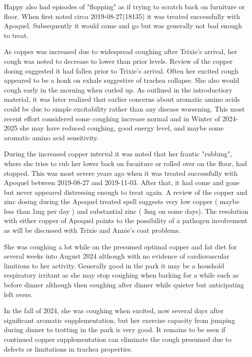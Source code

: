 {Happy also had episodes of "flopping"  as if trying to scratch
back on furniture or floor. When first noted circa 2019-08-27(18135)
it was treated successfully with Apoquel. Subsequently it would
come and go but was generally not bad enough to treat.
 

As copper was increased due to widespread coughing after Trixie's
arrival, her cough was noted to decrease to lower than prior levels.
Review of the copper dosing suggested it had fallen prior to Trixie's
arrival.
Often her excited cough appeared to be a honk on exhale suggestive of
trachea collapse. She also would cough early in the morning
when curled up. 
As outlined in the introductiory material, it was later realized 
that earlier concerns about aromatic amino acids could be
due to simple excitability rather than any disease worsening.
This most recent effort considered some coughing increase normal
and in Winter of 2024-2025   she may have reduced coughing, good energy level,
and maybe some  aromatic amino acid sensitivity. 

During the increased copper interval it was noted that
her frantic "rubbing", where she tries to rub her lower
back on fucniture or rolled over on the floor,
had stopped. This was most severe years ago when it
was treated successfully with Apoquel between 2019-08-27
and 2019-11-03. After that, it had come and gone but never
appeared distressing enough to treat again. A review of the
copper and zinc dosing during the Apoquel treated spell
suggests very low copper ( maybe less than 1mg per day )
and substantial zinc ( 3mg on some days). The resolution
with either copper of Apoquel points to the possibility of
a pathogen involvement as will be discussed with Trixie
and Annie's coat problems. 

She was coughing a lot while on the presumed optimal
copper and fat diet for several weeks into August
2024 although with no evidence of cardiovascular
limitions to her activity. Generally good in the park
it may be a houshold respiratory irritant  as she
may stop coughing when barking for a while  such as before
dinner although then coughing after dinner while quieter
but anticipating left overs. 

In the fall of 2024, she was coughing when excited, 
now several days after   significant
aromatic supplementation, but her exercize capacity from
jumping during dinner to trotting in the park is very good.
It remains to be seen if continued copper supplementation can
eliminate the cough presumed due to defects or limitations in 
trachea properties.  

}
